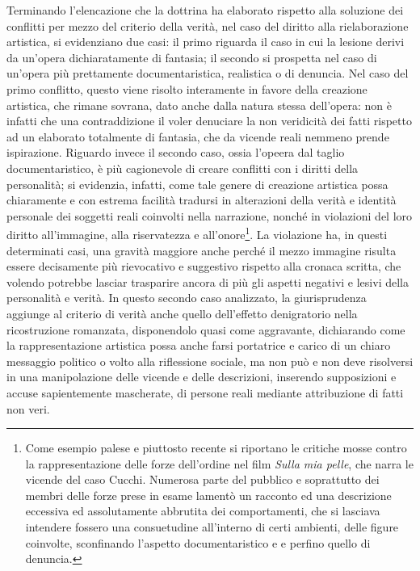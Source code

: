 Terminando l'elencazione che la dottrina ha elaborato rispetto alla soluzione dei conflitti per mezzo del criterio della verità, nel caso del diritto alla rielaborazione artistica, si evidenziano due casi:
il primo riguarda il caso in cui la lesione derivi da un'opera dichiaratamente di fantasia; il secondo si prospetta nel caso di un'opera più prettamente documentaristica, realistica o di denuncia.
Nel caso del primo conflitto, questo viene risolto interamente in favore della creazione artistica, che rimane sovrana, dato anche dalla natura stessa dell'opera: non è infatti che una contraddizione il voler denuciare la non veridicità dei fatti rispetto ad un elaborato totalmente di fantasia, che da vicende reali nemmeno prende ispirazione.
Riguardo invece il secondo caso, ossia l'opeera dal taglio documentaristico, è più cagionevole di creare conflitti con i diritti della personalità; si evidenzia, infatti, come
tale genere di creazione artistica possa chiaramente e con estrema facilità tradursi in alterazioni della verità e identità personale dei soggetti reali coinvolti nella narrazione, nonché in violazioni del loro diritto all’immagine, alla riservatezza e all’onore\footnote{Come esempio palese e piuttosto recente si riportano le critiche mosse contro la rappresentazione delle forze dell'ordine nel film \textit{Sulla mia pelle}, che narra le vicende del caso Cucchi. Numerosa parte del pubblico e soprattutto dei membri delle forze prese in esame lamentò un racconto ed una descrizione eccessiva ed assolutamente abbrutita dei comportamenti, che si lasciava intendere fossero una consuetudine all'interno di certi ambienti, delle figure coinvolte, sconfinando l'aspetto documentaristico e e perfino quello di denuncia. }.
La violazione ha, in questi determinati casi, una gravità maggiore anche perché il mezzo immagine risulta essere decisamente più rievocativo e suggestivo rispetto alla cronaca scritta, che volendo potrebbe lasciar trasparire ancora di più gli aspetti negativi e lesivi della personalità e verità.
In questo secondo caso analizzato, la giurisprudenza aggiunge al criterio di verità anche quello dell'effetto denigratorio nella ricostruzione romanzata, disponendolo quasi come aggravante, dichiarando come la rappresentazione artistica possa anche farsi portatrice e carico di un chiaro messaggio politico o volto alla riflessione sociale, ma non può e non deve risolversi in una manipolazione delle vicende e delle descrizioni, inserendo supposizioni e accuse sapientemente mascherate, di persone reali mediante attribuzione di fatti non veri.

